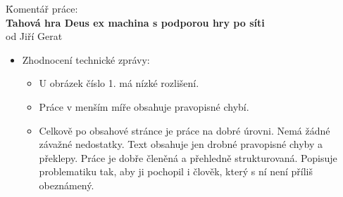 \documentclass[a4paper,12pt]{article}
\begin{document}
\begin{tabbing}
	\= Komentář práce:\\ \textbf{Tahová hra Deus ex machina s podporou hry po síti}\\
	\+ od Jiří Gerat
\end{tabbing}
\begin{itemize}
	\item Zhodnocení technické zprávy:
	\begin{itemize}
		\item U obrázek číslo 1. má nízké rozlišení.
		\item Práce v menším míře obsahuje pravopisné chybí.
		\item Celkově po obsahové stránce je práce na dobré úrovni. Nemá žádné závažné nedostatky. Text obsahuje jen drobné pravopisné chyby a překlepy. Práce je dobře členěná a přehledně strukturovaná. Popisuje problematiku tak, aby ji pochopil i člověk, který s ní není příliš obeznámený.
	\end{itemize}
\end{itemize}
\end{document}
